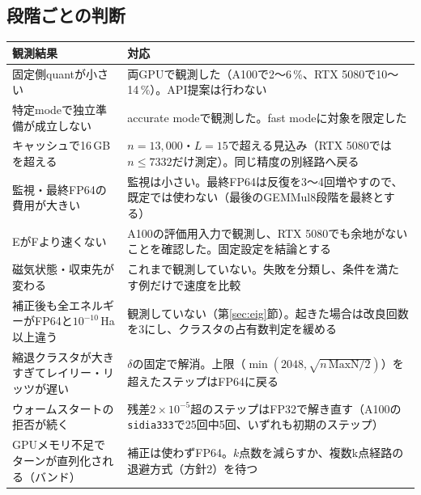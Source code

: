 \documentclass[a4paper,11pt]{ltjsarticle}
\newcommand{\code}[1]{\texttt{#1}}
\newcommand{\E}[1]{\times10^{#1}}
\begin{document}
\subsection{段階ごとの判断}
\noindent\begin{tabularx}{\linewidth}{@{}p{46mm}Y@{}}
\toprule
観測結果 & 対応\\
\midrule
固定側quantが小さい & 両GPUで観測した（A100で2〜6\,\%、RTX 5080で10〜14\,\%）。API提案は行わない\\
特定modeで独立準備が成立しない & accurate modeで観測した。fast modeに対象を限定した\\
キャッシュで16\,GBを超える & $n=13{,}000$・$L=15$で超える見込み（RTX 5080では$n\le7332$だけ測定）。同じ精度の別経路へ戻る\\
監視・最終FP64の費用が大きい & 監視は小さい。最終FP64は反復を3〜4回増やすので、既定では使わない（最後のGEMMul8段階を最終とする）\\
EがFより速くない & A100の評価用入力で観測し、RTX 5080でも余地がないことを確認した。固定設定を結論とする\\
磁気状態・収束先が変わる & これまで観測していない。失敗を分類し、条件を満たす例だけで速度を比較\\
\midrule
補正後も全エネルギーがFP64と$10^{-10}$\,Ha以上違う & 観測していない（第\ref{sec:eig}節）。起きた場合は改良回数を3にし、クラスタの占有数判定を緩める\\
縮退クラスタが大きすぎてレイリー・リッツが遅い & $\delta$の固定で解消。上限（$\min(2048,\sqrt{n\,\mathrm{MaxN}/2})$）を超えたステップはFP64に戻る\\
ウォームスタートの拒否が続く & 残差$2\E{-5}$超のステップはFP32で解き直す（A100の\code{sidia333}で25回中5回、いずれも初期のステップ）\\
GPUメモリ不足でターンが直列化される（バンド） & 補正は使わずFP64。$k$点数を減らすか、複数k点経路の退避方式（方針2）を待つ\\
\bottomrule
\end{tabularx}
\end{document}
